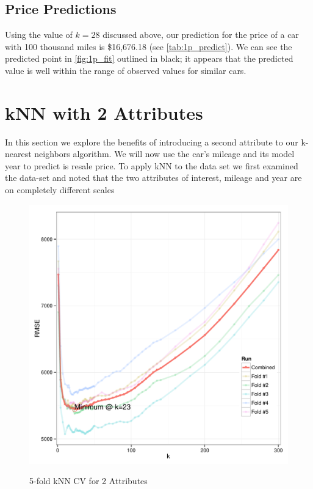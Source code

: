 \documentclass[11pt, fleqn]{article}
\begin{document}
\subsection{Price Predictions}

Using the value of $k=28$ discussed above, our prediction for the price of a car with 100 thousand miles is \$16,676.18 (see \cref{tab:1p_predict}). We can see the predicted point in \cref{fig:1p_fit} outlined in black; it appears that the predicted value is well within the range of observed values for similar cars.



\section{kNN with 2 Attributes}

In this section we explore the benefits of introducing a second attribute to our k-nearest neighbors algorithm. We will now use the car's mileage and its model year to predict is resale price.  To apply kNN to the data set we first examined the data-set and noted that the two attributes of interest, mileage and year are on completely different scales



\begin{figure}[!htb]
  \centering
  \caption{5-fold kNN CV for 2 Attributes}
  \includegraphics[scale=.5]{2p_cv_k.pdf}
  \label{fig:2p_k}
\end{figure}
\end{document}
